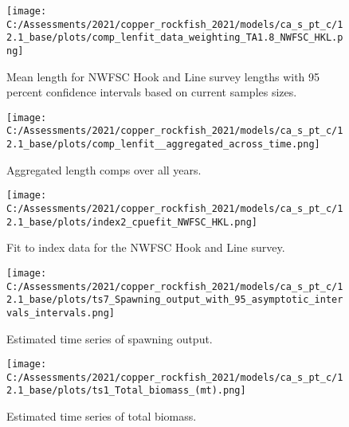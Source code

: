 \documentclass[11pt,
  english,
  a4paper,
]{article}
\begin{document}
\begin{figure}
\centering
\texttt{[image: C:/Assessments/2021/copper\_rockfish\_2021/models/ca\_s\_pt\_c/12.1\_base/plots/comp\_lenfit\_data\_weighting\_TA1.8\_NWFSC\_HKL.png]}
\caption{Mean length for NWFSC Hook and Line survey lengths with 95 percent confidence intervals based on current samples sizes.\label{fig:hkl-mean-len-fit}}
\end{figure}

\tagmcend\tagstructend


\begin{figure}
\centering
\texttt{[image: C:/Assessments/2021/copper\_rockfish\_2021/models/ca\_s\_pt\_c/12.1\_base/plots/comp\_lenfit\_\_aggregated\_across\_time.png]}
\caption{Aggregated length comps over all years.\label{fig:agg-len-fit}}
\end{figure}

\tagmcend\tagstructend


\begin{figure}
\centering
\texttt{[image: C:/Assessments/2021/copper\_rockfish\_2021/models/ca\_s\_pt\_c/12.1\_base/plots/index2\_cpuefit\_NWFSC\_HKL.png]}
\caption{Fit to index data for the NWFSC Hook and Line survey.\label{fig:index-fit}}
\end{figure}

\tagmcend\tagstructend


\begin{figure}
\centering
\texttt{[image: C:/Assessments/2021/copper\_rockfish\_2021/models/ca\_s\_pt\_c/12.1\_base/plots/ts7\_Spawning\_output\_with\_95\_asymptotic\_intervals\_intervals.png]}
\caption{Estimated time series of spawning output.\label{fig:ssb}}
\end{figure}

\tagmcend\tagstructend


\begin{figure}
\centering
\texttt{[image: C:/Assessments/2021/copper\_rockfish\_2021/models/ca\_s\_pt\_c/12.1\_base/plots/ts1\_Total\_biomass\_(mt).png]}
\caption{Estimated time series of total biomass.\label{fig:tot-bio}}
\end{figure}
\end{document}

